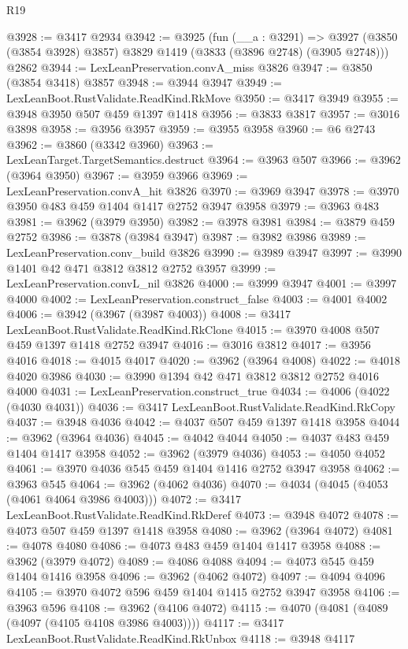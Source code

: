 \begin{lexlean}{R19}
\begin{coremodule}
@3928 := @3417 @2934
@3942 := @3925
    (fun (__a : @3291) =>
    @3927 (@3850 (@3854 @3928) @3857) @3829 @1419 (@3833 (@3896 @2748) (@3905 @2748)))
    @2862
@3944 := LexLeanPreservation.convA_miss @3826
@3947 := @3850 (@3854 @3418) @3857
@3948 := @3944 @3947
@3949 := LexLeanBoot.RustValidate.ReadKind.RkMove
@3950 := @3417 @3949
@3955 := @3948 @3950 @507 @459 @1397 @1418
@3956 := @3833 @3817
@3957 := @3016 @3898
@3958 := @3956 @3957
@3959 := @3955 @3958
@3960 := @6 @2743
@3962 := @3860 (@3342 @3960)
@3963 := LexLeanTarget.TargetSemantics.destruct
@3964 := @3963 @507
@3966 := @3962 (@3964 @3950)
@3967 := @3959 @3966
@3969 := LexLeanPreservation.convA_hit @3826
@3970 := @3969 @3947
@3978 := @3970 @3950 @483 @459 @1404 @1417 @2752 @3947 @3958
@3979 := @3963 @483
@3981 := @3962 (@3979 @3950)
@3982 := @3978 @3981
@3984 := @3879 @459 @2752
@3986 := @3878 (@3984 @3947)
@3987 := @3982 @3986
@3989 := LexLeanPreservation.conv_build @3826
@3990 := @3989 @3947
@3997 := @3990 @1401 @42 @471 @3812 @3812 @2752 @3957
@3999 := LexLeanPreservation.convL_nil @3826
@4000 := @3999 @3947
@4001 := @3997 @4000
@4002 := LexLeanPreservation.construct_false
@4003 := @4001 @4002
@4006 := @3942 (@3967 (@3987 @4003))
@4008 := @3417 LexLeanBoot.RustValidate.ReadKind.RkClone
@4015 := @3970 @4008 @507 @459 @1397 @1418 @2752 @3947
@4016 := @3016 @3812
@4017 := @3956 @4016
@4018 := @4015 @4017
@4020 := @3962 (@3964 @4008)
@4022 := @4018 @4020 @3986
@4030 := @3990 @1394 @42 @471 @3812 @3812 @2752 @4016 @4000
@4031 := LexLeanPreservation.construct_true
@4034 := @4006 (@4022 (@4030 @4031))
@4036 := @3417 LexLeanBoot.RustValidate.ReadKind.RkCopy
@4037 := @3948 @4036
@4042 := @4037 @507 @459 @1397 @1418 @3958
@4044 := @3962 (@3964 @4036)
@4045 := @4042 @4044
@4050 := @4037 @483 @459 @1404 @1417 @3958
@4052 := @3962 (@3979 @4036)
@4053 := @4050 @4052
@4061 := @3970 @4036 @545 @459 @1404 @1416 @2752 @3947 @3958
@4062 := @3963 @545
@4064 := @3962 (@4062 @4036)
@4070 := @4034 (@4045 (@4053 (@4061 @4064 @3986 @4003)))
@4072 := @3417 LexLeanBoot.RustValidate.ReadKind.RkDeref
@4073 := @3948 @4072
@4078 := @4073 @507 @459 @1397 @1418 @3958
@4080 := @3962 (@3964 @4072)
@4081 := @4078 @4080
@4086 := @4073 @483 @459 @1404 @1417 @3958
@4088 := @3962 (@3979 @4072)
@4089 := @4086 @4088
@4094 := @4073 @545 @459 @1404 @1416 @3958
@4096 := @3962 (@4062 @4072)
@4097 := @4094 @4096
@4105 := @3970 @4072 @596 @459 @1404 @1415 @2752 @3947 @3958
@4106 := @3963 @596
@4108 := @3962 (@4106 @4072)
@4115 := @4070 (@4081 (@4089 (@4097 (@4105 @4108 @3986 @4003))))
@4117 := @3417 LexLeanBoot.RustValidate.ReadKind.RkUnbox
@4118 := @3948 @4117

\end{coremodule}
\end{lexlean}
